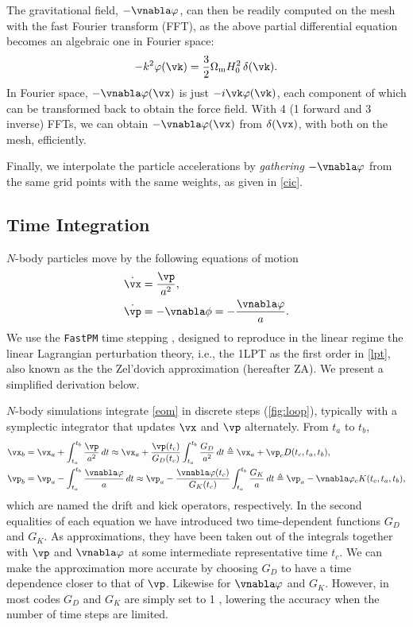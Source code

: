 \documentclass[modern, dvipsnames]{aastex631}
\renewcommand{\d}{d}
\newcommand{\Omegam}{\Omega_\mathrm{m}}
\begin{document}
The gravitational field, $- \vnabla \varphi$, can then be readily
computed on the mesh with the fast Fourier transform (FFT), as the above
partial differential equation becomes an algebraic one in Fourier space:
%
\begin{equation}
- k^2 \varphi(\vk) = \frac32 \Omegam H_0^2 \, \delta(\vk).
\end{equation}
%
In Fourier space, $- \vnabla \varphi(\vx)$ is just $- i \vk
\varphi(\vk)$, each component of which can be transformed back to obtain
the force field.
With 4 (1 forward and 3 inverse) FFTs, we can obtain $- \vnabla
\varphi(\vx)$ from $\delta(\vx)$, with both on the mesh, efficiently.

Finally, we interpolate the particle accelerations by \emph{gathering}
$- \vnabla \varphi$ from the same grid points with the same weights, as
given in \eqref{cic}.


\vspace{1em}
\subsection{Time Integration}
\label{sec:integ}

$N$-body particles move by the following equations of motion
%
\begin{align}
\dot\vx &= \frac{\vp}{a^2}, \nonumber\\
\dot\vp &= -\vnabla\phi = - \frac{\vnabla\varphi}a.
\label{eom}
\end{align}
%
We use the \texttt{FastPM} time stepping \citep{FastPM}, designed to
reproduce in the linear regime the linear Lagrangian perturbation
theory, i.e., the 1LPT as the first order in \eqref{lpt}, also known as
the the Zel'dovich approximation (hereafter ZA).
We present a simplified derivation below.

$N$-body simulations integrate \eqref{eom} in discrete steps
(\autoref{fig:loop}), typically with a symplectic integrator that
updates $\vx$ and $\vp$ alternately.
From $t_a$ to $t_b$,
%
\begin{align}
\vx_b
  &= \vx_a + \int_{t_a}^{t_b} \frac{\vp}{a^2} \,\d t
  \approx \vx_a + \frac{\vp(t_c)}{G_D(t_c)}
    \int_{t_a}^{t_b} \frac{G_D}{a^2} \,\d t
  \triangleq \vx_a + \vp_c D(t_c, t_a, t_b), \nonumber\\
%
\vp_b
  &= \vp_a - \int_{t_a}^{t_b} \frac{\vnabla\varphi}a \,\d t
  \approx \vp_a - \frac{\vnabla\varphi(t_c)}{G_K(t_c)}
    \int_{t_a}^{t_b} \frac{G_K}a \,\d t
  \triangleq \vp_a - \vnabla\varphi_c K(t_c, t_a, t_b),
\label{eom_integ}
\end{align}
%
which are named the drift and kick operators, respectively.
In the second equalities of each equation we have introduced two
time-dependent functions $G_D$ and $G_K$.
As approximations, they have been taken out of the integrals together
with $\vp$ and $\vnabla\varphi$ at some intermediate representative time
$t_c$.
We can make the approximation more accurate by choosing $G_D$ to have a
time dependence closer to that of $\vp$.
Likewise for $\vnabla\varphi$ and $G_K$.
However, in most codes $G_D$ and $G_K$ are simply set to 1
\citep{QuinnEtAl1997}, lowering the accuracy when the number of time
steps are limited.
\end{document}
